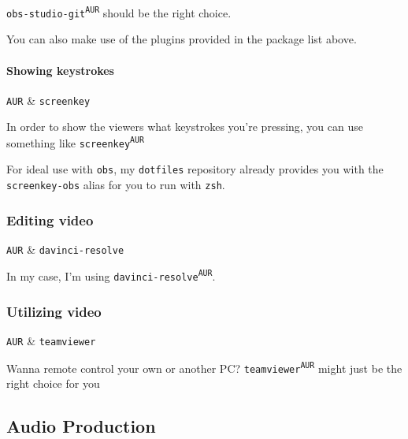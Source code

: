 \documentclass[10pt]{dustdoc}
\begin{document}
\texttt{obs-studio-git\textsuperscript{\texttt{AUR}}} should be the right choice.

You can also make use of the plugins provided in the package list above.

\paragraph{Showing keystrokes}
\label{par:showing-keystrokes}

\begin{packagetable}
    \texttt{AUR} & \texttt{screenkey} \\ 
\end{packagetable}

In order to show the viewers what keystrokes you’re pressing, you can use something like \texttt{screenkey\textsuperscript{\texttt{AUR}}}

\begin{NOTE}
    For ideal use with \texttt{obs}, my \texttt{dotfiles} repository already provides you with the \texttt{screenkey-obs} alias for you to run with \texttt{zsh}.

\end{NOTE}

\subsubsection{Editing video}
\label{sec:editing-video}

\begin{packagetable}
    \texttt{AUR} & \texttt{davinci-resolve} \\ 
\end{packagetable}

In my case, I’m using \texttt{davinci-resolve\textsuperscript{\texttt{AUR}}}.

\subsubsection{Utilizing video}
\label{sec:utilizing-video}

\begin{packagetable}
    \texttt{AUR} & \texttt{teamviewer} \\ 
\end{packagetable}

Wanna remote control your own or another PC?
\texttt{teamviewer\textsuperscript{\texttt{AUR}}} might just be the right choice for you

\subsection{Audio Production}
\label{sec:audio-production}
\end{document}
